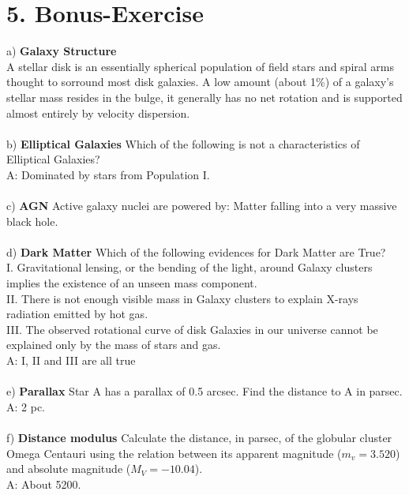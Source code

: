 \section*{5. Bonus-Exercise}

a) \textbf{Galaxy Structure}\\
A stellar disk is an essentially spherical population of field stars and spiral arms thought to sorround
most disk galaxies. A low amount (about 1\%) of a galaxy's stellar mass resides in the bulge, it 
generally has no net rotation and is supported almost entirely by velocity dispersion.\\
\\
b) \textbf{Elliptical Galaxies}
Which of the following is not a characteristics of Elliptical Galaxies?\\
A: Dominated by stars from Population I.\\
\\
c) \textbf{AGN}
Active galaxy nuclei are powered by:
Matter falling into a very massive black hole.\\
\\
d) \textbf{Dark Matter}
Which of the following evidences for Dark Matter are True?\\
I. Gravitational lensing, or the bending of the light, around Galaxy clusters implies the existence of an
unseen mass component.\\
II. There is not enough visible mass in Galaxy clusters to explain X-rays radiation emitted by hot gas.\\
III. The observed rotational curve of disk Galaxies in our universe cannot be explained only by the mass 
of stars and gas.\\
A: I, II and III are all true\\
\\
e) \textbf{Parallax}
Star A has a parallax of 0.5 arcsec. Find the distance to A in parsec.\\
A: 2 pc.\\
\\
f) \textbf{Distance modulus}
Calculate the distance, in parsec, of the globular cluster Omega Centauri using the relation between its
apparent magnitude ($m_v = 3.520$) and absolute magnitude ($M_V = -10.04$).\\
A: About 5200.
